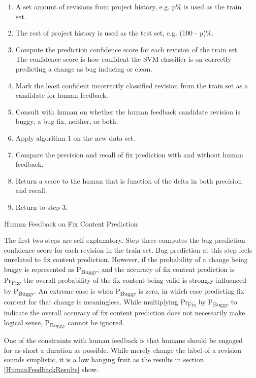 \documentclass[10pt, conference, letterpaper, compsocconf]{IEEEtran}
\begin{document}
\begin{algorithm}
\begin{enumerate}
\item A set amount of revisions from project history, e.g. p\% is used as
the train set.
\item The rest of project history is used as the test set, e.g. (100 - p)\%.
\item Compute the prediction confidence score for each revision of the train set.
The confidence score is how confident the SVM classifier is on correctly predicting a change as bug inducing or clean.
\item Mark the least confident incorrectly classified revision from the train set as a candidate for human feedback.
\item Consult with human on whether the human feedback candidate revision is buggy, a bug fix, neither, or both.
\item Apply algorithm 1 on the new data set.
\item Compare the precision and recall of fix prediction with and without human feedback.
\item Return a score to the human that is function of the delta in both precision and recall.
\item Return to step 3.
\end{enumerate}
\caption{Human Feedback on Fix Content Prediction}
\end{algorithm}

The first two steps are self explanatory. Step three computes the bug prediction confidence score for each revision in the train set.
Bug prediction at this step feels unrelated to fix content prediction.
However, if the probability of a change being buggy is represented as P\textsubscript{Buggy},
and the accuracy of fix content prediction is Pr\textsubscript{Fix},
the overall probability of the fix content being valid is strongly influenced by P\textsubscript{Buggy}.
An extreme case is when P\textsubscript{Buggy} is zero, in which case predicting fix content for that change is meaningless.
While multiplying Pr\textsubscript{Fix} by P\textsubscript{Buggy}
to indicate the overall accuracy of fix content prediction does not necessarily make logical sense, P\textsubscript{Buggy} cannot be ignored.

One of the constraints with human feedback is that humans should be engaged for as short a duration as possible.
While merely change the label of a revision sounds simplistic, it is a low hanging fruit as the results in section \ref{HumanFeedbackResults} show.
\end{document}
